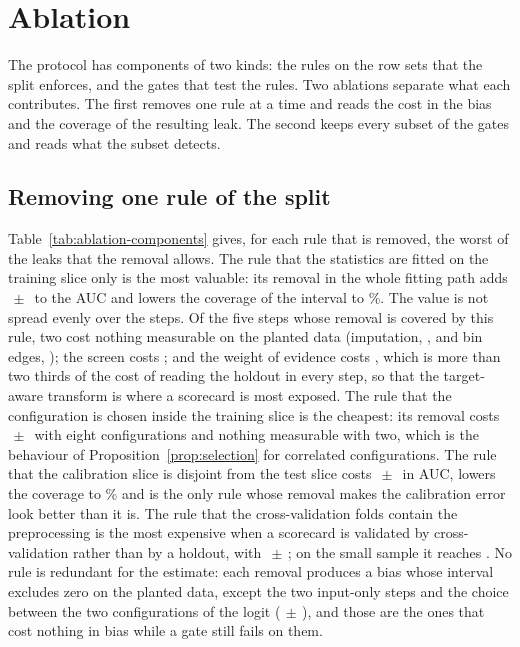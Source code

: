 \section{Ablation}
\label{sec:ablation}

The protocol has components of two kinds: the rules on the row sets that the split enforces, and the gates that test the rules. Two ablations separate what each contributes. The first removes one rule at a time and reads the cost in the bias and the coverage of the resulting leak. The second keeps every subset of the gates and reads what the subset detects.

\subsection{Removing one rule of the split}

Table~\ref{tab:ablation-components} gives, for each rule that is removed, the worst of the leaks that the removal allows. The rule that the statistics are fitted on the training slice only is the most valuable: its removal in the whole fitting path adds $\,\pm\,$ to the AUC and lowers the coverage of the interval to \%. The value is not spread evenly over the steps. Of the five steps whose removal is covered by this rule, two cost nothing measurable on the planted data (imputation, , and bin edges, ); the screen costs ; and the weight of evidence costs , which is more than two thirds of the cost of reading the holdout in every step, so that the target-aware transform is where a scorecard is most exposed. The rule that the configuration is chosen inside the training slice is the cheapest: its removal costs $\,\pm\,$ with eight configurations and nothing measurable with two, which is the behaviour of Proposition~\ref{prop:selection} for correlated configurations. The rule that the calibration slice is disjoint from the test slice costs $\,\pm\,$ in AUC, lowers the coverage to \% and is the only rule whose removal makes the calibration error look better than it is. The rule that the cross-validation folds contain the preprocessing is the most expensive when a scorecard is validated by cross-validation rather than by a holdout, with $\,\pm\,$; on the small sample it reaches . No rule is redundant for the estimate: each removal produces a bias whose interval excludes zero on the planted data, except the two input-only steps and the choice between the two configurations of the logit ($\,\pm\,$), and those are the ones that cost nothing in bias while a gate still fails on them.

